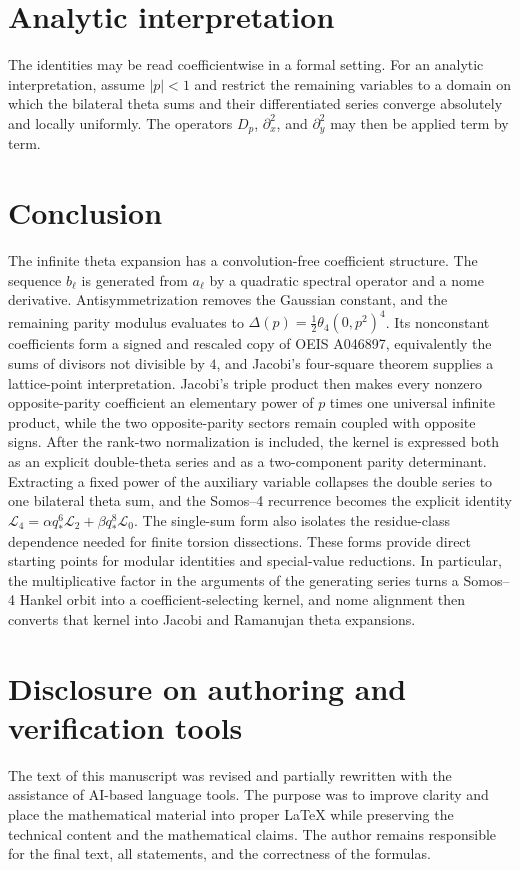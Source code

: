 \documentclass[11pt]{article}
\numberwithin{equation}{section}
\newcommand{\Dp}{D_p}
\begin{document}
\section{Analytic interpretation}
The identities may be read coefficientwise in a formal setting. For an analytic interpretation, assume $|p|<1$ and restrict the remaining variables to a domain on which the bilateral theta sums and their differentiated series converge absolutely and locally uniformly. The operators $\Dp$, $\partial_x^2$, and $\partial_y^2$ may then be applied term by term.

\section{Conclusion}
The infinite theta expansion has a convolution-free coefficient structure. The sequence $b_\ell$ is generated from $a_\ell$ by a quadratic spectral operator and a nome derivative. Antisymmetrization removes the Gaussian constant, and the remaining parity modulus evaluates to $\Delta(p)=\tfrac12\theta_4(0,p^2)^4$.  Its nonconstant coefficients form a signed and rescaled copy of OEIS A046897, equivalently the sums of divisors not divisible by $4$, and Jacobi's four-square theorem supplies a lattice-point interpretation.  Jacobi's triple product then makes every nonzero opposite-parity coefficient an elementary power of $p$ times one universal infinite product, while the two opposite-parity sectors remain coupled with opposite signs. After the rank-two normalization is included, the kernel is expressed both as an explicit double-theta series and as a two-component parity determinant.  Extracting a fixed power of the auxiliary variable collapses the double series to one bilateral theta sum, and the Somos--4 recurrence becomes the explicit identity $\mathcal L_4=\alpha q_\ast^6\mathcal L_2+\beta q_\ast^8\mathcal L_0$.  The single-sum form also isolates the residue-class dependence needed for finite torsion dissections. These forms provide direct starting points for modular identities and special-value reductions.  In particular, the multiplicative factor in the arguments of the generating series turns a Somos--4 Hankel orbit into a coefficient-selecting kernel, and nome alignment then converts that kernel into Jacobi and Ramanujan theta expansions.

\section*{Disclosure on authoring and verification tools}
The text of this manuscript was revised and partially rewritten with the
assistance of AI-based language tools.  The purpose was to improve clarity and
place the mathematical material into proper \LaTeX{} while preserving the
technical content and the mathematical claims.  The author remains responsible
for the final text, all statements, and the correctness of the formulas.
\end{document}
